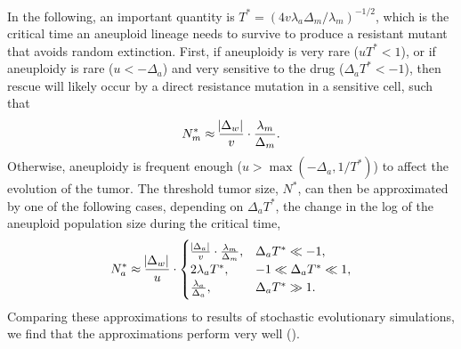 \documentclass[12pt]{extarticle}
\begin{document}
In the following, an important quantity is $T^* = (4 v \lambda_a \Delta_m/\lambda_m)^{-1/2}$, which is the critical time an aneuploid lineage needs to survive to produce a resistant mutant that avoids random extinction.
First, if aneuploidy is very rare ($u T^*< 1$), or if aneuploidy is rare ($u < -\Delta_a$) and very sensitive to the drug ($\Delta_a T^* < -1$), then rescue will likely occur by a direct resistance mutation in a sensitive cell, such that 
\begin{equation}
N_m^* \approx \frac{\abs{\Delta_w}}{v} \cdot \frac{\lambda_m}{\Delta_m} .
\end{equation}
Otherwise, aneuploidy is frequent enough ($u > \max{(-\Delta_a, 1/T^*)}$) to affect the evolution of the tumor. 
The threshold tumor size, $N^*$, can then be approximated by one of the following cases, depending on $\Delta_a T^*$, the change in the log of the aneuploid population size during the critical time,
\begin{equation}\label{rescue_prob_approx}
\begin{aligned}
N_a^* \approx 
  \frac{\abs{\Delta_w}}{u} \cdot \begin{cases}
    \frac{\abs{\Delta_a}}{v} \cdot \frac{\lambda_m}{\Delta_m} ,&
  \Delta_a T^* \ll -1 ,\\ 
  2\lambda_a T^* ,&
  -1 \ll \Delta_a T^* \ll 1  ,\\ 
  \frac{\lambda_a}{\Delta_a} ,&
   \Delta_a T^* \gg 1 .
  \end{cases}
\end{aligned}
\end{equation}
Comparing these approximations to results of stochastic evolutionary simulations, we find that the approximations perform very well ().
\end{document}
